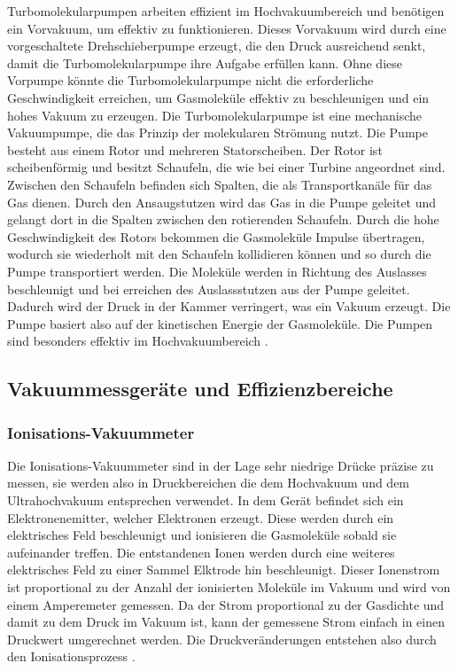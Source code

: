 Turbomolekularpumpen arbeiten effizient im Hochvakuumbereich und benötigen ein Vorvakuum, um effektiv zu funktionieren.
Dieses Vorvakuum wird durch eine vorgeschaltete Drehschieberpumpe erzeugt, die den Druck ausreichend senkt,
damit die Turbomolekularpumpe ihre Aufgabe erfüllen kann. Ohne diese Vorpumpe könnte die Turbomolekularpumpe nicht die erforderliche Geschwindigkeit erreichen,
um Gasmoleküle effektiv zu beschleunigen und ein hohes Vakuum zu erzeugen.
Die Turbomolekularpumpe ist eine mechanische Vakuumpumpe, die das Prinzip der molekularen Strömung nutzt.
Die Pumpe besteht aus einem Rotor und mehreren Statorscheiben. Der Rotor ist scheibenförmig und besitzt Schaufeln, die wie bei einer Turbine angeordnet sind.
Zwischen den Schaufeln befinden sich Spalten, die als Transportkanäle für das Gas dienen.
Durch den Ansaugstutzen wird das Gas in die Pumpe geleitet und gelangt dort in die Spalten zwischen den rotierenden Schaufeln. Durch die
hohe Geschwindigkeit des Rotors bekommen die Gasmoleküle Impulse übertragen, wodurch sie wiederholt mit den Schaufeln kollidieren können und so durch
die Pumpe transportiert werden. Die Moleküle werden in Richtung des Auslasses beschleunigt und bei erreichen des Auslassstutzen aus der Pumpe geleitet.
Dadurch wird der Druck in der Kammer verringert, was ein Vakuum erzeugt.
Die Pumpe basiert also auf der kinetischen Energie der Gasmoleküle. Die Pumpen sind besonders effektiv im Hochvakuumbereich
\cite{turbomolekularpumpe}.

\subsection{Vakuummessgeräte und Effizienzbereiche}
\subsubsection{Ionisations-Vakuummeter}
Die Ionisations-Vakuummeter sind in der Lage sehr niedrige Drücke präzise zu messen, sie werden also in Druckbereichen die dem Hochvakuum 
und dem Ultrahochvakuum entsprechen verwendet. In dem Gerät befindet sich ein Elektronenemitter, welcher Elektronen erzeugt. Diese
werden durch ein elektrisches Feld beschleunigt und ionisieren die Gasmoleküle sobald sie aufeinander treffen. Die entstandenen Ionen werden durch eine 
weiteres elektrisches Feld zu einer Sammel Elktrode hin beschleunigt. Dieser Ionenstrom ist proportional zu der Anzahl der ionisierten Moleküle im Vakuum und 
wird von einem Amperemeter gemessen. Da der Strom proportional zu der Gasdichte und damit zu dem Druck im Vakuum ist, kann der gemessene Strom einfach in einen 
Druckwert umgerechnet werden. Die Druckveränderungen entstehen also durch den Ionisationsprozess \cite{Grundlagen der Vakuumtechnik}.

